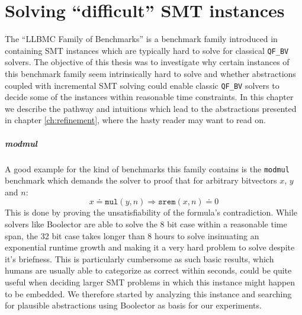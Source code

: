 \chapter{Solving \enquote{difficult} SMT instances}
\label{ch:solving_hard_smt}
\label{sec:solving_hard_smt:llbmc_benchmarks}
The \enquote{LLBMC Family of Benchmarks} is a benchmark family introduced in \cite{sc2017-proceedings} containing SMT instances which are typically hard to solve for classical \texttt{QF\_BV} solvers. The objective of this thesis was to investigate why certain instances of this benchmark family seem intrinsically hard to solve and whether abstractions coupled with incremental SMT solving could enable classic \texttt{QF\_BV} solvers to decide some of the instances within reasonable time constraints.
In this chapter we describe the pathway and intuitions which lead to the abstractions presented in chapter \ref{ch:refinement}, where the hasty reader may want to read on.

\paragraph{modmul}
A good example for the kind of benchmarks this family contains is the \texttt{modmul} benchmark which demands the solver to proof that for arbitrary bitvectors $x$, $y$ and $n$:
\[
x \doteq \texttt{mul}\left(y,n\right) \Rightarrow \texttt{srem}\left(x,n\right) \doteq 0
\]
This is done by proving the unsatisfiability of the formula's contradiction.
While solvers like Boolector are able to solve the 8 bit case within a reasonable time span, the 32 bit case takes longer than 8 hours to solve insinuating an exponential runtime growth and making it a very hard problem to solve despite it's briefness. This is particularly cumbersome as such basic results, which humans are usually able to categorize as correct within seconds, could be quite useful when deciding larger SMT problems in which this instance might happen to be embedded. We therefore started by analyzing this instance and searching for plausible abstractions using Boolector as basis for our experiments.

